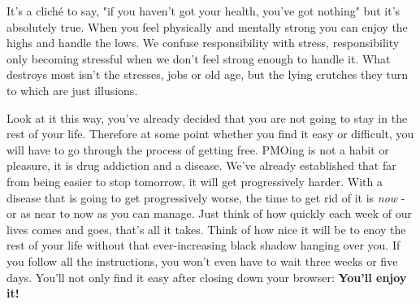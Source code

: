 \documentclass[easypeasy.tex]{subfiles}
\begin{document}
It's a cliché to say, "if you haven't got your health, you've got nothing" but it's absolutely true. When you feel physically and mentally strong you can enjoy the highs and handle the lows. We confuse responsibility with stress, responsibility only becoming stressful when we don't feel strong enough to handle it. What destroys most isn't the stresses, jobs or old age, but the lying crutches they turn to which are just illusions.

Look at it this way, you've already decided that you are not going to stay in the rest of your life. Therefore at some point whether you find it easy or difficult, you will have to go through the process of getting free. PMOing is not a habit or pleasure, it is drug addiction and a disease. We've already established that far from being easier to stop tomorrow, it will get progressively harder. With a disease that is going to get progressively worse, the time to get rid of it is \textit{now} - or as near to now as you can manage. Just think of how quickly each week of our lives comes and goes, that's all it takes. Think of how nice it will be to enoy the rest of your life without that ever-increasing black shadow hanging over you. If you follow all the instructions, you won't even have to wait three weeks or five days. You'll not only find it easy after closing down your browser: \textbf{You'll enjoy it!}
\end{document}
